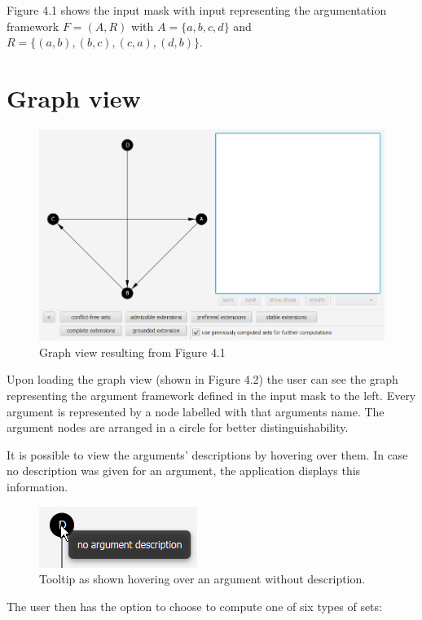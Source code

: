 \documentclass[draft,final]{vutinfth} %
\newcommand{\hl}{\par\vspace{6pt}} %
\begin{document}
Figure 4.1 shows the input mask with input representing the argumentation framework $F=(A,R)$ with $A=\{a,b,c,d\}$ and $R=\{(a,b),(b,c),(c,a),(d,b)\}$.\hl

\section{Graph view}

\FloatBarrier
	\begin{figure}[!h]
		\centering
		\includegraphics[width=\linewidth]{pics/demo.png}
		\caption{Graph view resulting from Figure 4.1}
	\end{figure}
\FloatBarrier

Upon loading the graph view (shown in Figure 4.2) the user can see the graph representing the argument framework defined in the input mask to the left. Every argument is represented by a node labelled with that arguments name. The argument nodes are arranged in a circle for better distinguishability.\hl
It is possible to view the arguments' descriptions by hovering over them. In case no description was given for an argument, the application displays this information.\hl

\FloatBarrier
	\begin{figure}[!h]
		\centering
		\includegraphics[scale=2]{pics/argdes.png}
		\caption{Tooltip as shown hovering over an argument without description.}
	\end{figure}
\FloatBarrier

The user then has the option to choose to compute one of six types of sets:
\end{document}
